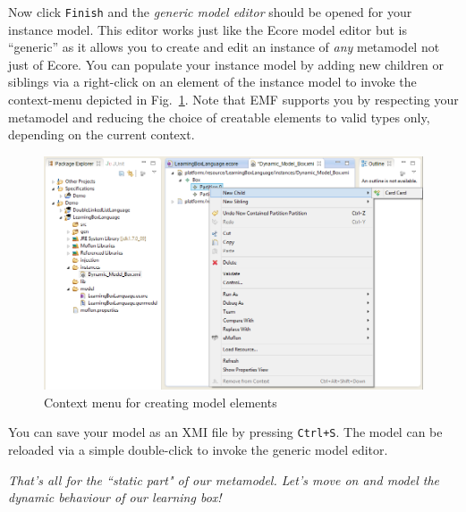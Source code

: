 Now click \texttt{Finish} and the \emph{generic model editor} should be opened for your instance model.
This editor works just like the Ecore model editor but is ``generic'' as it allows you to create and edit an instance of \emph{any} metamodel not just of Ecore.
You can populate your instance model by adding new children or siblings via a right-click on an element of the instance model to invoke the context-menu depicted in Fig.~\ref{fig:create_instance}.
Note that EMF supports you by respecting your metamodel and reducing the choice of creatable elements to valid types only, depending on the current context.

\begin{figure}[htbp]
	\centering
  \includegraphics[width=\textwidth]{pics/modelBrowserBilder/adjustModel.png}
	\caption{Context menu for creating model elements}
	\label{fig:create_instance}
\end{figure}

You can save your model as an XMI file by pressing \texttt{Ctrl+S}.
The model can be reloaded via a simple double-click to invoke the generic model editor.

\textsl{That's all for the ``static part" of our metamodel. Let's move on and model the dynamic behaviour of our learning box!}

